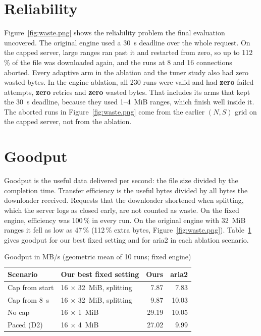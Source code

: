 \section{Reliability}
Figure~\ref{fig:waste.png} shows the reliability problem the final evaluation uncovered. The original engine used a 30~s deadline over the whole request. On the capped server, large ranges ran past it and restarted from zero, so up to 112\,\% of the file was downloaded again, and the runs at 8 and 16 connections aborted. Every adaptive arm in the ablation and the tuner study also had zero wasted bytes. In the engine ablation, all 230 runs were valid and had \textbf{zero} failed attempts, \textbf{zero} retries and \textbf{zero} wasted bytes. That includes its arms that kept the 30~s deadline, because they used 1--4~MiB ranges, which finish well inside it. The aborted runs in Figure~\ref{fig:waste.png} come from the earlier $(N, S)$ grid on the capped server, not from the ablation.

\section{Goodput}
Goodput is the useful data delivered per second: the file size divided by the completion time. Transfer efficiency is the useful bytes divided by all bytes the downloader received. Requests that the downloader shortened when splitting, which the server logs as closed early, are not counted as waste. On the fixed engine, efficiency was 100\,\% in every run. On the original engine with 32~MiB ranges it fell as low as 47\,\% (112\,\% extra bytes, Figure~\ref{fig:waste.png}). Table~\ref{tab:goodput} gives goodput for our best fixed setting and for aria2 in each ablation scenario.
\begin{table}[H]\centering
\caption{Goodput in MB/s (geometric mean of 10 runs; fixed engine)}\label{tab:goodput}
\begin{tabular}{@{}llrr@{}}
\toprule
\textbf{Scenario} & \textbf{Our best fixed setting} & \textbf{Ours} & \textbf{aria2}\\
\midrule
Cap from start & 16 $\times$ 32~MiB, splitting & 7.87 & 7.83\\
Cap from 8~s & 16 $\times$ 32~MiB, splitting & 9.87 & 10.03\\
No cap & 16 $\times$ 1~MiB & 29.19 & 10.05\\
Paced (D2) & 16 $\times$ 4~MiB & 27.02 & 9.99\\
\bottomrule
\end{tabular}
\end{table}

